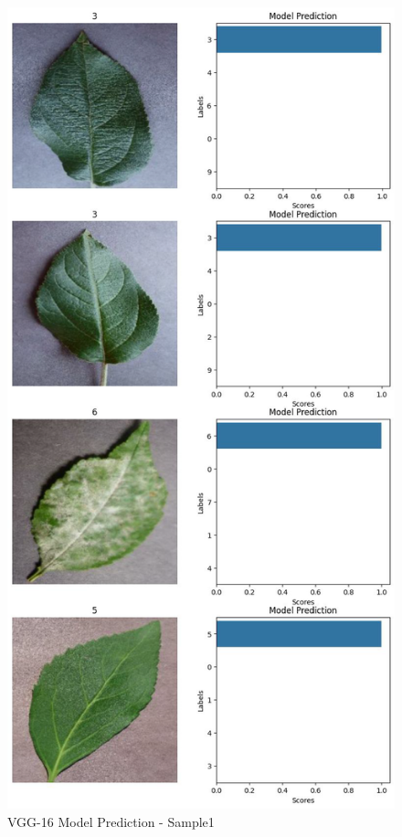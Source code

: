 \begin{figure}
    \centering
    \includegraphics[height=\textheight]{graphics//chapter6/model prediction1.png}
    \caption{VGG-16 Model Prediction - Sample1}
    \label{fig:vgg-prediction1}
\end{figure}

\FloatBarrier
